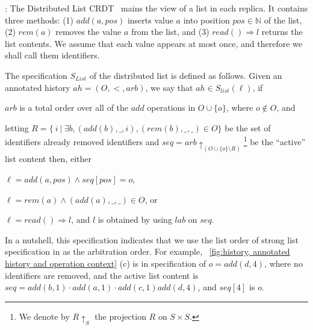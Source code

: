 \bigskip
{}: The Distributed List CRDT~\cite{Attiya:2016} mains the view of a list in each replica. It contains three methods: (1)
$\mathit{add}(a,\mathit{pos})$ inserts value $a$ into position
$\mathit{pos} \in \mathbb{N}$ of the list, (2) $\mathit{rem}(a)$ removes the
value $a$ from the list, and (3) $\mathit{read}() \Rightarrow l$
returns the list contents.
%
We assume that each value appears at most once, and therefore we shall
call them identifiers.

The specification $S_{\mathit{List}}$ of the distributed list is
defined as follows.
Given an annotated history $ah = (O,<,\mathit{arb})$, we say that $ ah
\in S_{\mathit{list}}(\ell)$, if
\begin{inparaenum}[(1)]
\item $arb$ is a total order over all of the $add$ operations in $O \cup \{ o \}$, where $o \notin O$, and
\item letting \mbox{$R = \{\ i\ |\ \exists b,
    (add(b),\_,i),(rem(b),\_,\_) \in O \}$} be the set of identifiers already removed identifiers and $\mathit{seq} =
  \mathit{arb}\!\!\!\uparrow_{( O \cup \{ o \} \setminus R)}$\footnote{We denote by $R \uparrow_{S}$ the projection $R$ on $S \times S$.} be the ``active'' list content
  then, either
    \begin{inparaenum}[(i)]
    \item $\ell = add(a,pos) \wedge \mathit{seq}[pos] = o$,
    \item $\ell = rem(a) \wedge (add(a),\_,\_) \in O$, or
    \item $\ell = read() \Rightarrow l$, and $l$ is obtained by using $\mathit{lab}$ on $\mathit{seq}$.
    \end{inparaenum}
  \end{inparaenum}
In a nutshell, this specification indicates that we use the list order
of strong list specification in \cite{Attiya:2016} as the arbitration
order. 
%
For example, \figurename~\ref{fig:history, annotated history and
  operation context} (c) is in specification of $o =
\mathit{add}(d,4)$, where no identifiers are removed, and the active list content is $\mathit{seq} = \mathit{add}(b,1) \cdot \mathit{add}(a,1) \cdot \mathit{add}(c,1) \mathit{add}(d,4)$, and $\mathit{seq}[4]$ is $o$.




